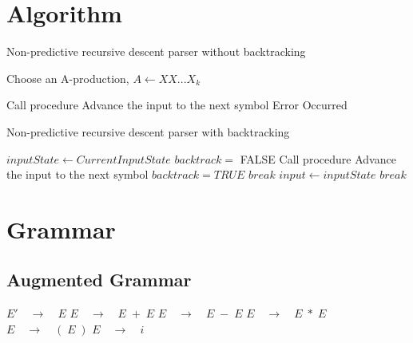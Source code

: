 \section{Algorithm}

\begin{algorithm}[H]
	\caption{Non-predictive recursive descent parser without backtracking}
	\begin{algorithmic}[1]
		
		\State Choose an A-production, $A \gets X X . . . X_k$
		
		\State Call procedure 
		\State Advance the input to the next symbol
		\Else
		\State Error Occurred
		\EndIf
		\EndFor
		\EndProcedure
		\State {} 		
	\end{algorithmic}
\end{algorithm}

\begin{algorithm}[H]
	\caption{Non-predictive recursive descent parser with backtracking}
	\begin{algorithmic}[1]
		
		\State $inputState \gets CurrentInputState$ 
		\State $backtrack =$ FALSE
		\State Call procedure 
		\State Advance the input to the next symbol
		\Else {}
		\State $backtrack = TRUE$ 
		\State $break$
		\EndIf
		\EndFor
		\State $input \gets inputState$ 
		\Else {}
		\State $break$
		\EndIf
		\EndFor
		\EndProcedure
		\State {} 		
	\end{algorithmic}
\end{algorithm}

\section{Grammar}
\subsection{Augmented Grammar}
\begin{algorithmic}[1]
	\setcounter{ALG@line}{-1}	
	\State $E' \quad \rightarrow \quad E$
	\State $E \quad \rightarrow \quad E \; + \; E$
	\State $E \quad \rightarrow \quad E \; - \; E$
	\State $E \quad \rightarrow \quad E \; * \; E$
	\State $E \quad \rightarrow \quad ( \; E \; )$
	\State $E \quad \rightarrow \quad i$
\end{algorithmic}

